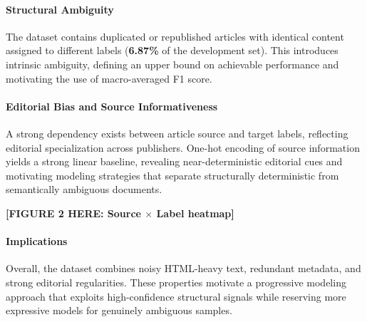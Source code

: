 \paragraph{Structural Ambiguity}
The dataset contains duplicated or republished articles with identical content
assigned to different labels (\textbf{6.87\%} of the development set). This
introduces intrinsic ambiguity, defining an upper bound on achievable
performance and motivating the use of macro-averaged F1 score.

\paragraph{Editorial Bias and Source Informativeness}
A strong dependency exists between article source and target labels, reflecting
editorial specialization across publishers. One-hot encoding of source
information yields a strong linear baseline, revealing near-deterministic
editorial cues and motivating modeling strategies that separate structurally
deterministic from semantically ambiguous documents.

\textbf{[FIGURE 2 HERE: Source $\times$ Label heatmap]}

\paragraph{Implications}
Overall, the dataset combines noisy HTML-heavy text, redundant metadata, and
strong editorial regularities. These properties motivate a progressive modeling
approach that exploits high-confidence structural signals while reserving more
expressive models for genuinely ambiguous samples.

